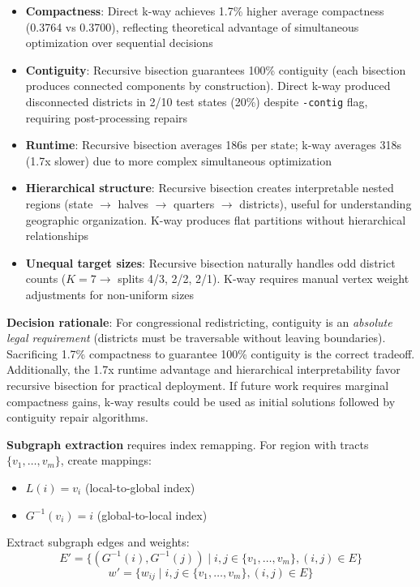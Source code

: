 \begin{itemize}
    \item \textbf{Compactness}: Direct k-way achieves 1.7\% higher average compactness (0.3764 vs 0.3700), reflecting theoretical advantage of simultaneous optimization over sequential decisions~\cite{karypis1999multilevel}
    \item \textbf{Contiguity}: Recursive bisection guarantees 100\% contiguity (each bisection produces connected components by construction). Direct k-way produced disconnected districts in 2/10 test states (20\%) despite \texttt{-contig} flag, requiring post-processing repairs
    \item \textbf{Runtime}: Recursive bisection averages 186s per state; k-way averages 318s (1.7x slower) due to more complex simultaneous optimization
    \item \textbf{Hierarchical structure}: Recursive bisection creates interpretable nested regions (state $\to$ halves $\to$ quarters $\to$ districts), useful for understanding geographic organization. K-way produces flat partitions without hierarchical relationships
    \item \textbf{Unequal target sizes}: Recursive bisection naturally handles odd district counts ($K = 7 \to$ splits 4/3, 2/2, 2/1). K-way requires manual vertex weight adjustments for non-uniform sizes
\end{itemize}

\textbf{Decision rationale}: For congressional redistricting, contiguity is an \textit{absolute legal requirement} (districts must be traversable without leaving boundaries). Sacrificing 1.7\% compactness to guarantee 100\% contiguity is the correct tradeoff. Additionally, the 1.7x runtime advantage and hierarchical interpretability favor recursive bisection for practical deployment. If future work requires marginal compactness gains, k-way results could be used as initial solutions followed by contiguity repair algorithms.

\textbf{Subgraph extraction} requires index remapping. For region with tracts $\{v_1, \ldots, v_m\}$, create mappings:
\begin{itemize}
    \item $L(i) = v_i$ (local-to-global index)
    \item $G^{-1}(v_i) = i$ (global-to-local index)
\end{itemize}

Extract subgraph edges and weights:
\begin{equation}
    E' = \{(G^{-1}(i), G^{-1}(j)) \mid i,j \in \{v_1, \ldots, v_m\}, (i,j) \in E\}
\end{equation}
\begin{equation}
    w' = \{w_{ij} \mid i,j \in \{v_1, \ldots, v_m\}, (i,j) \in E\}
\end{equation}

